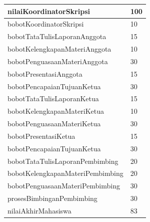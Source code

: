 	\begin{table}[H]
	\centering
		\begin{tabular}{| m{7cm} | m{5cm} |}
		\hline
			nilaiKoordinatorSkripsi & 100\\
			\hline
			bobotKoordinatorSkripsi & 10\\
			\hline
			bobotTataTulisLaporanAnggota & 15\\
			\hline
			bobotKelengkapanMateriAnggota & 10\\
			\hline
			bobotPenguasaanMateriAnggota & 30\\
			\hline
			bobotPresentasiAnggota & 15\\
			\hline
			bobotPencapaianTujuanKetua & 30\\
			\hline
			bobotTataTulisLaporanKetua & 15\\
			\hline
			bobotKelengkapanMateriKetua & 10\\
			\hline
			bobotPenguasaanMateriKetua & 30\\
			\hline
			bobotPresentasiKetua & 15\\
			\hline
			bobotPencapaianTujuanKetua & 30\\
			\hline
			bobotTataTulisLaporanPembimbing & 20\\
			\hline
			bobotKelengkapanMateriPembimbing &20\\
			\hline
			bobotPenguasaanMateriPembimbing & 30\\
			\hline
			prosesBimbinganPembimbing & 30\\
			\hline
			nilaiAkhirMahasiswa & 83\\
			\hline
		\end{tabular}
	\end{table}
